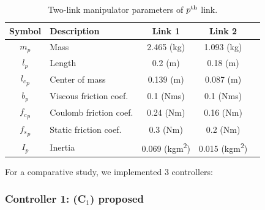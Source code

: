 \documentclass[final,5p,times,twocolumn,authoryear]{elsarticle}
\begin{document}
\begin{table}[t]
    \renewcommand{\arraystretch}{1.3}
    \caption{Two-link manipulator parameters of $p\textsuperscript{th}$ link.}
    \centering
    \begin{tabular}{c m{6.5em} c c c }
    \hline
    \textbf{Symbol} & \textbf{Description} & \textbf{Link 1} & \textbf{Link 2} \\
    \hline
    \hline 
    $m_p$ & Mass & 2.465 (kg) & 1.093 (kg) \\
    \hline
    $l_p$  & Length & 0.2 (m) & 0.18 (m) \\
    \hline
    ${l_c}_p$ & Center of mass & 0.139 (m) & 0.087 (m) \\
    \hline
    $b_p$   & Viscous friction coef. &  0.1 (Nms) & 0.1 (Nms) \\
    \hline
    ${f_c}_p$  & Coulomb friction coef. &  0.24 (Nm) & 0.16 (Nm) \\
    \hline
    ${f_s}_p$  & Static friction coef. &  0.3 (Nm) & 0.2 (Nm) \\
    \hline
    $I_p$  & Inertia & 0.069 (kgm\textsuperscript{2}) & 0.015 (kgm\textsuperscript{2}) \\
    \hline
    \end{tabular}
    \label{table:system:params}
\end{table}

For a comparative study, we implemented 3 controllers:

\subsubsection*{Controller 1: (C$_1$) proposed}
\end{document}
